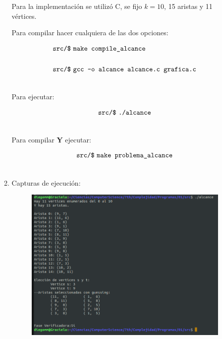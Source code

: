 \documentclass[14pt,letterpaper]{article}
\begin{document}
\begin{itemize}
\begin{enumerate}
    Para la implementación se utilizó C, se fijo $k=10$, 15 aristas y 11 vértices.

    Para compilar hacer cualquiera de las dos opciones:

    \begin{align*}
      \text{{\tt src/\$}}\ & \text{{\tt make compile\_alcance}}\\\\
      \text{{\tt src/\$}}\ & \text{{\tt gcc -o alcance alcance.c grafica.c}}\\\\      
    \end{align*}

    Para ejecutar:
    
    \begin{align*}
      \text{{\tt src/\$}}\ & \text{{\tt ./alcance}}\\\\
    \end{align*}

    \newpage
    Para compilar {\bf Y} ejecutar:
    
    \begin{align*}
      \text{{\tt src/\$}}\ & \text{{\tt make problema\_alcance}}\\\\
    \end{align*}

  \item Capturas de ejecución:

    \begin{figure}[h]
      \includegraphics[width=10cm]{alcance_1.png}
      \centering
    \end{figure}

    \hfill\break
    

\end{enumerate}
\end{itemize}
\end{document}
